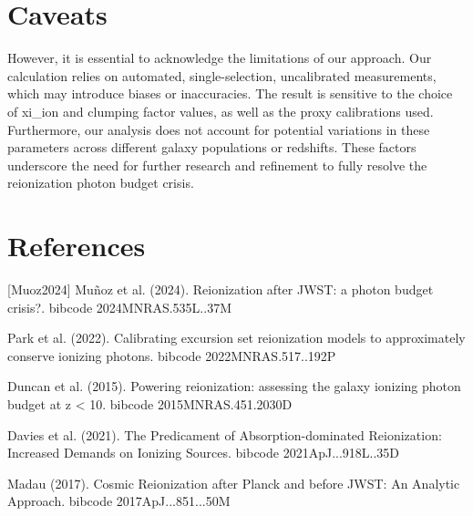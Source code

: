 \documentclass[twocolumn]{aastex631}
\begin{document}
\section{Caveats}
However, it is essential to acknowledge the limitations of our approach. Our calculation relies on automated, single-selection, uncalibrated measurements, which may introduce biases or inaccuracies. The result is sensitive to the choice of xi\_ion and clumping factor values, as well as the proxy calibrations used. Furthermore, our analysis does not account for potential variations in these parameters across different galaxy populations or redshifts. These factors underscore the need for further research and refinement to fully resolve the reionization photon budget crisis.
\section*{References}
\footnotesize
[Muoz2024] Muñoz et al. (2024). Reionization after JWST: a photon budget crisis?. bibcode 2024MNRAS.535L..37M \par [Park2022] Park et al. (2022). Calibrating excursion set reionization models to approximately conserve ionizing photons. bibcode 2022MNRAS.517..192P \par [Duncan2015] Duncan et al. (2015). Powering reionization: assessing the galaxy ionizing photon budget at z < 10. bibcode 2015MNRAS.451.2030D \par [Davies2021] Davies et al. (2021). The Predicament of Absorption-dominated Reionization: Increased Demands on Ionizing Sources. bibcode 2021ApJ...918L..35D \par [Madau2017] Madau (2017). Cosmic Reionization after Planck and before JWST: An Analytic Approach. bibcode 2017ApJ...851...50M
\end{document}
